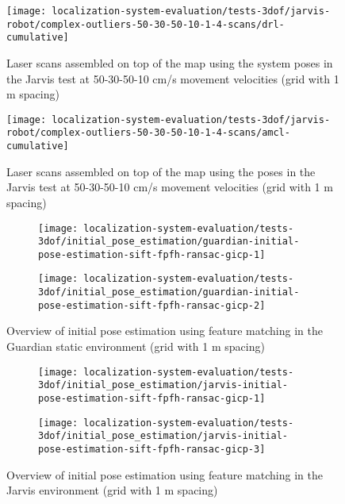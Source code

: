 \begin{figure}[H]
	\centering
	\texttt{[image: localization-system-evaluation/tests-3dof/jarvis-robot/complex-outliers-50-30-50-10-1-4-scans/drl-cumulative]}
	\caption{Laser scans assembled on top of the map using the  system poses in the Jarvis test at 50-30-50-10 cm/s movement velocities (grid with 1 m spacing)}
	\label{fig:localization-system-evaluation_complex-path-with-outliers-50-30-50-10cm-per-sec-velocity-1-4-scans-drl-cumulative}
\end{figure}

\begin{figure}[H]
	\centering
	\texttt{[image: localization-system-evaluation/tests-3dof/jarvis-robot/complex-outliers-50-30-50-10-1-4-scans/amcl-cumulative]}
	\caption{Laser scans assembled on top of the map using the  poses in the Jarvis test at 50-30-50-10 cm/s movement velocities (grid with 1 m spacing)}
	\label{fig:localization-system-evaluation_complex-path-with-outliers-50-30-50-10cm-per-sec-velocity-1-4-scans-amcl-cumulative}
\end{figure}


\begin{figure}[H]
	\centering
	\begin{subfigure}[ht]{0.49\textwidth}
		\centering
		\texttt{[image: localization-system-evaluation/tests-3dof/initial\_pose\_estimation/guardian-initial-pose-estimation-sift-fpfh-ransac-gicp-1]}
	\end{subfigure}
	\par\smallskip
	\begin{subfigure}[ht]{0.49\textwidth}
		\centering
		\texttt{[image: localization-system-evaluation/tests-3dof/initial\_pose\_estimation/guardian-initial-pose-estimation-sift-fpfh-ransac-gicp-2]}
	\end{subfigure}
	\caption{Overview of initial pose estimation using feature matching in the Guardian static environment (grid with 1 m spacing)}
	\label{fig:localization-system-evaluation_ship-interior-initial-pose-estimation-sift-fpfh-ransac-gicp-1}
\end{figure}


\begin{figure}[H]
	\centering
	\begin{subfigure}[ht]{0.49\textwidth}
		\centering
		\texttt{[image: localization-system-evaluation/tests-3dof/initial\_pose\_estimation/jarvis-initial-pose-estimation-sift-fpfh-ransac-gicp-1]}
	\end{subfigure}
	\par\smallskip
	\begin{subfigure}[ht]{0.49\textwidth}
		\centering
		\texttt{[image: localization-system-evaluation/tests-3dof/initial\_pose\_estimation/jarvis-initial-pose-estimation-sift-fpfh-ransac-gicp-3]}
	\end{subfigure}
	\caption{Overview of initial pose estimation using feature matching in the Jarvis environment (grid with 1 m spacing)}
	\label{fig:localization-system-evaluation_jarvis-initial-pose-estimation-sift-fpfh-ransac-gicp-1}
\end{figure}


